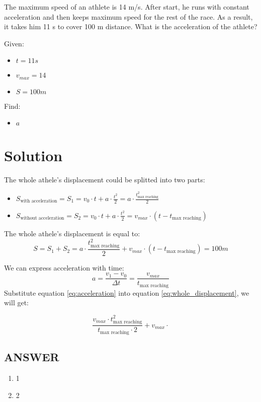 
The maximum speed of an athlete is 14 m/s. After start, he runs with constant acceleration and
then keeps maximum speed for the rest of the race. As a result, it takes him 11 s to cover 100 m
distance. What is the acceleration of the athlete?

\bigbreak Given:

\begin{itemize}
    \item $t = 11s$
    \item $v_{max} = 14$
    \item $S = 100m$
\end{itemize}

\bigbreak Find:

\begin{itemize}
    \item $a$
\end{itemize}

\section*{Solution}

The whole athele's displacement could be splitted into two parts:

\begin{itemize}
    \item $S_{\text{with acceleration}} = S_1 = v_0 \cdot t + a \cdot \frac{t^2}{2} = a \cdot \frac{t_{\text{max reaching}}^2}{2}$
    \item $ S_{\text{without acceleration}} = S_2 = v_0 \cdot t + a \cdot \frac{t^2}{2} = v_{max} \cdot (t - t_{\text{max reaching}})$
\end{itemize}

The whole athele's displacement is equal to:
\begin{equation}
    \label{eq:whole_displacement}
    S = S_1 + S_2 = a \cdot \frac{t_{\text{max reaching}}^2}{2} + v_{max} \cdot (t - t_{\text{max reaching}}) = 100m
\end{equation}

We can express acceleration with time:
\begin{equation}
    \label{eq:acceleration}
    a = \frac{v_1 - v_0}{\Delta t} = \frac{v_{max}}{t_{\text{max reaching}}}
\end{equation}
Substitute equation \ref{eq:acceleration} into equation \ref{eq:whole_displacement}, we will get:

$$\frac{v_{max} \cdot t_{\text{max reaching}}^2}{t_{\text{max reaching}} \cdot 2} + v_{max} \cdot $$


\vfill \subsection*{ANSWER}
\begin{enumerate}
    \item 1
    \item 2
\end{enumerate}

